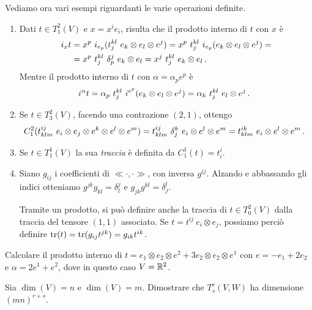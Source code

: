 \begin{example}
	Vediamo ora vari esempi riguardanti le varie operazioni definite.
	\begin{enumerate}
		\item Dati $t\in T_1^2(V)$ e $x=x^ie_i$, risulta che il prodotto interno di $t$ con $x$ è 
		\begin{align*}
		i_xt &= x^p\ i_{e_p}(t_j^{kl}\ e_k\otimes e_l\otimes e^j) = x^p\ t_j^{kl}\ i_{e_p} (e_k\otimes e_l\otimes e^j) =\\
		&= x^p\ t_j^{kl}\ \delta_p^j\ e_k\otimes e_l = x^j\ t_j^{kl}\ e_k\otimes e_l \punto
		\end{align*}
		Mentre il prodotto interno di $t$ con $\alpha = \alpha_pe^p$ è
		\begin{align*}
		i^\alpha t = \alpha_p\ t_j^{kl}\ i^{e^p}(e_k\otimes e_l\otimes e^j) = \alpha_k\ t_j^{kl}\ e_l\otimes e^j \, \text{. }
		\end{align*}
		
		\item Se $t\in T_3^2(V)$, facendo una contrazione $(2,1)$, ottengo
		\begin{equation*}
			C_1^2 (t_{klm}^{ij}\ e_i\otimes e_j\otimes e^k\otimes e^l\otimes e^m ) = t_{klm}^{ij}\ \delta_j^k\ e_i\otimes e^l\otimes e^m = t_{klm}^{ik}\ e_i\otimes e^l\otimes e^m \punto
		\end{equation*}
		
		\item Se $t\in T_1^1(V)$ la sua \emph{traccia} è definita da $C_1^1(t) = t_i^i$. 

		\item Siano $g_{ij}$ i coefficienti di $\ll \cdot, \cdot \gg$, con inversa $g^{ij}$. Alzando e abbassando gli indici otteniamo $g^{jk}g_{kl} = \delta_l^j$ e $g_{jk}g^{kl} = \delta_j^l$.
		
		Tramite un prodotto, si può definire anche la traccia di $t\in T_0^2(V)$ dalla traccia del tensore $(1,1)$ associato. Se $t=t^{ij}\ e_i\otimes e_j$, possiamo perciò definire $\operatorname{tr} (t) = \operatorname{tr} (g_{ij}t^{jk}) = g_{ik}t^{ik}$.
	\end{enumerate}
\end{example}

\begin{exercise}
	Calcolare il prodotto interno di $t=e_1\otimes e_2\otimes e^2+3e_2\otimes e_2\otimes e^1$ con $e = -e_1+2e_2$ e $\alpha = 2e^1+e^2$, dove in questo caso $V=\mathbb R^2$.
\end{exercise}
\begin{exercise}
	Sia $\dim(V) = n$ e $\dim(V) = m$. Dimostrare che $T_s^r(V,W)$ ha dimensione $(mn)^{r+s}$.
\end{exercise}

